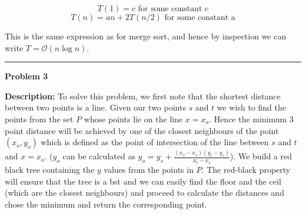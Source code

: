 \documentclass[10pt, a4paper]{article}
\newcommand{\BigO}{\mathcal{O}}
\begin{document}
$$T(1) = c \text{ for some constant c}$$
$$T(n) = an + 2T(n/2) \text{ for some constant a}$$

This is the same expression as for merge sort, and hence by inspection we can write $T = \BigO(n\log n)$.

\rule{\textwidth}{0.8pt}
\vspace{5pt}

\newpage
\large{\textbf{Problem 3}}
\normalsize

\textbf{Description:}
To solve this problem, we first note that the shortest distance between two points is a line. Given our two points $s$ and $t$ we wish to find the points from the set $P$ whose points lie on the line $x = x_o$. Hence the minimum 3 point distance will be achieved by one of the closest neighbours of the point $(x_o, y_o)$ which is defined as the point of intersection of the line between $s$ and $t$ and $x = x_o$. ($y_o$ can be calculated as $y_o = y_s + \frac{(x_o-x_s)(y_t-y_s)}{x_t-x_s}$). We build a red black tree containing the $y$ values from the points in $P$. The red-black property will ensure that the tree is a bst and we can easily find the floor and the ceil (which are the closest neighbours) and proceed to calculate the distances and chose the minimum and return the corresponding point.
\end{document}
